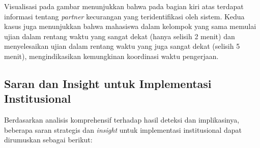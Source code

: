 Visualisasi pada gambar menunjukkan bahwa pada bagian kiri atas terdapat informasi tentang \textit{partner} kecurangan yang teridentifikasi oleh sistem. Kedua kasus juga menunjukkan bahwa mahasiswa dalam kelompok yang sama memulai ujian dalam rentang waktu yang sangat dekat (hanya selisih 2 menit) dan menyelesaikan ujian dalam rentang waktu yang juga sangat dekat (selisih 5 menit), mengindikasikan kemungkinan koordinasi waktu pengerjaan.

\subsection{Saran dan Insight untuk Implementasi Institusional}
\label{subsec:saranInsightRiil}

Berdasarkan analisis komprehensif terhadap hasil deteksi dan implikasinya, beberapa saran strategis dan \textit{insight} untuk implementasi institusional dapat dirumuskan sebagai berikut:

